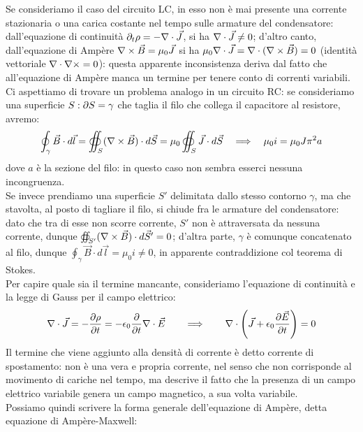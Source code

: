\documentclass[]{article}
\begin{document}
Se consideriamo il caso del circuito LC, in esso non è mai presente una corrente stazionaria o una carica costante nel tempo sulle armature del condensatore: dall'equazione di continuità $ \partial_t \rho = - \nabla\cdot\vec{J} $, si ha $ \nabla\cdot\vec{J} \neq 0 $; d'altro canto, dall'equazione di Ampère $ \nabla\times\vec{B} = \mu_0 \vec{J} $ si ha $ \mu_0 \nabla\cdot\vec{J} = \nabla\cdot(\nabla\times\vec{B}) = 0 $ (identità vettoriale $ \nabla\cdot\nabla\times = 0 $): questa apparente inconsistenza deriva dal fatto che all'equazione di Ampère manca un termine per tenere conto di correnti variabili. \\ 
%
Ci aspettiamo di trovare un problema analogo in un circuito RC: se consideriamo una superficie $ S : \partial S = \gamma $ che taglia il filo che collega il capacitore al resistore, avremo:
\begin{equation}
	\oint_{\gamma} \vec{B} \cdot d\vec{l} = \oiint_S (\nabla\times\vec{B}) \cdot d\vec{S} = \mu_0 \oiint_S \vec{J}\cdot d\vec{S} \quad\Longrightarrow\quad \mu_0 i = \mu_0 J \pi^2 a
	\label{eq:46}
\end{equation}
dove $ a $ è la sezione del filo: in questo caso non sembra esserci nessuna incongruenza. \\ 
%
Se invece prendiamo una superficie $ S' $ delimitata dallo stesso contorno $ \gamma $, ma che stavolta, al posto di tagliare il filo, si chiude fra le armature del condensatore: dato che tra di esse non scorre corrente, $ S' $  non è attraversata da nessuna corrente, dunque $ \oiint_{S'} (\nabla\times\vec{B}) \cdot d\vec{S}' = 0 $; d'altra parte, $ \gamma $ è comunque concatenato al filo, dunque $ \oint_{\gamma} \vec{B} \cdot d\vec{l} = \mu_0 i \neq 0 $, in apparente contraddizione col teorema di Stokes. \\ 
%
Per capire quale sia il termine mancante, consideriamo l'equazione di continuità e la legge di Gauss per il campo elettrico:
\begin{equation}
	\nabla\cdot\vec{J} = - \frac{\partial\rho}{\partial t} = - \epsilon_0 \frac{\partial}{\partial t} \nabla\cdot\vec{E} \qquad \Longrightarrow \qquad \nabla\cdot \left(\vec{J} + \epsilon_0 \frac{\partial\vec{E}}{\partial t}\right) = 0
	\label{eq:47}
\end{equation}
Il termine che viene aggiunto alla densità di corrente è detto corrente di spostamento: non è una vera e propria corrente, nel senso che non corrisponde al movimento di cariche nel tempo, ma descrive il fatto che la presenza di un campo elettrico variabile genera un campo magnetico, a sua volta variabile. \\ 
Possiamo quindi scrivere la forma generale dell'equazione di Ampère, detta equazione di Ampère-Maxwell:
\end{document}
